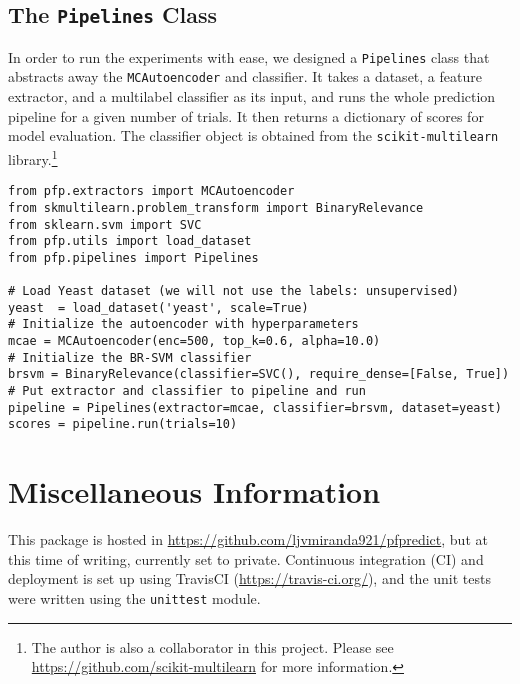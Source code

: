 \subsection{The \texttt{Pipelines} Class}

\par In order to run the experiments with ease, we designed a
\texttt{Pipelines} class that abstracts away the \texttt{MCAutoencoder} and
classifier. It takes a dataset, a feature extractor, and a multilabel
classifier as its input, and runs the whole prediction pipeline for a given
number of trials. It then returns a dictionary of scores for model evaluation.
The classifier object is obtained from the \texttt{scikit-multilearn}
library.\footnote{The author is also a collaborator in this project. Please see
\url{https://github.com/scikit-multilearn} for more information.}

\begin{lstlisting}[style=mypython, caption=Minimal example for the prediction
pipeline]
from pfp.extractors import MCAutoencoder
from skmultilearn.problem_transform import BinaryRelevance
from sklearn.svm import SVC
from pfp.utils import load_dataset
from pfp.pipelines import Pipelines

# Load Yeast dataset (we will not use the labels: unsupervised)
yeast  = load_dataset('yeast', scale=True)
# Initialize the autoencoder with hyperparameters
mcae = MCAutoencoder(enc=500, top_k=0.6, alpha=10.0)
# Initialize the BR-SVM classifier
brsvm = BinaryRelevance(classifier=SVC(), require_dense=[False, True])
# Put extractor and classifier to pipeline and run
pipeline = Pipelines(extractor=mcae, classifier=brsvm, dataset=yeast)
scores = pipeline.run(trials=10)
\end{lstlisting}

\section{Miscellaneous Information}

\par This package is hosted in
\url{https://github.com/ljvmiranda921/pfpredict}, but at this time of writing,
currently set to private. Continuous integration (CI) and deployment is set up
using TravisCI (\url{https://travis-ci.org/}), and the unit tests were written
using the \texttt{unittest} module.
